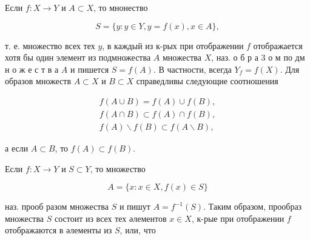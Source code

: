 \documentclass[10pt]{article}
\begin{document}
Если $f: X \rightarrow Y$ и $A \subset X$, то мнонество



\[

S=\{y: y \in Y, y=f(x), x \in A\},

\]



т. е. множество всех тех $y$, в каждый из к-рых при отображении $f$ отображается хотя бы один элемент из подмножества $A$ множества $X$, наз. о б р а 3 о м по дм н о ж е с т в а $A$ и пишется $S=f(A)$. В частности, всегда $Y_{f}=f(X)$. Для образов множеств $A \subset X$ и $B \subset X$ справедливы следующие соотношения



\[

\begin{gathered}

f(A \cup B)=f(A) \cup f(B), \\

f(A \cap B) \subset f(A) \cap f(B), \\

f(A) \backslash f(B) \subset f(A \backslash B),

\end{gathered}

\]



а если $A \subset B$, то $f(A) \subset f(B)$.



Если $f: X \rightarrow Y$ и $S \subset Y$, то множество



\[

A=\{x: x \in X, f(x) \in S\}

\]



наз. прооб разом множества $S$ и пишут $A=f^{-1}(S)$. Таким образом, прообраз множества $S$ состоит из всех тех әлементов $x \in X$, к-рые при отображении $f$ отображаются в әлементы из $S$, или, что
\end{document}
